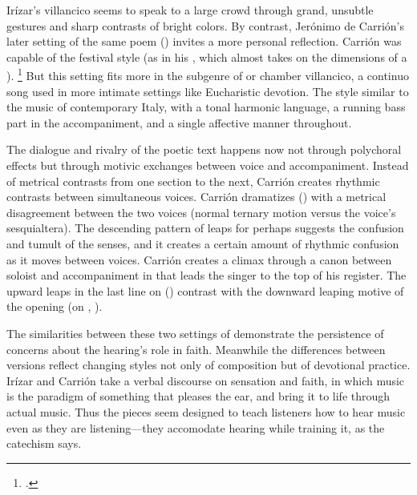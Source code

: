 Irízar's villancico seems to speak to a large crowd through grand, unsubtle gestures and sharp contrasts of bright colors.
By contrast, Jerónimo de Carrión's later setting of the same poem () invites a more personal reflection.%
    \Autocite[\XXX]{Cashner:SingingAboutSingingI}
Carrión was capable of the festival style (as in his , which almost takes on the dimensions of a ).%
\footnote{\signature{E-SE}{\XXX}.}
But this setting fits more in the subgenre of  or chamber villancico, a continuo song used in more intimate settings like Eucharistic devotion.%
The style similar to the  music of contemporary Italy, with a tonal harmonic language, a running bass part in the accompaniment, and a single affective manner throughout.


The dialogue and rivalry of the poetic text happens now not through polychoral effects but through motivic exchanges between voice and accompaniment.
Instead of metrical contrasts from one section to the next, Carrión creates rhythmic contrasts between simultaneous voices.
Carrión dramatizes  () with a metrical disagreement between the two voices (normal ternary motion versus the voice's sesquialtera).
The descending pattern of leaps for  perhaps suggests the confusion and tumult of the senses, and it creates a certain amount of rhythmic confusion as it moves between voices.
Carrión creates a climax through a canon between soloist and accompaniment in  that leads the singer to the top of his register.
The upward leaps in the last line on  () contrast with the downward leaping motive of the opening (on , ).

The similarities between these two settings of  demonstrate the persistence of concerns about the hearing's role in faith.
Meanwhile the differences between versions reflect changing styles not only of composition but of devotional practice.
Irízar and Carrión take a verbal discourse on sensation and faith, in which music is the paradigm of something that pleases the ear, and bring it to life through actual music.
Thus the pieces seem designed to teach listeners how to hear music even as they are listening---they accomodate hearing while training it, as the catechism says.


